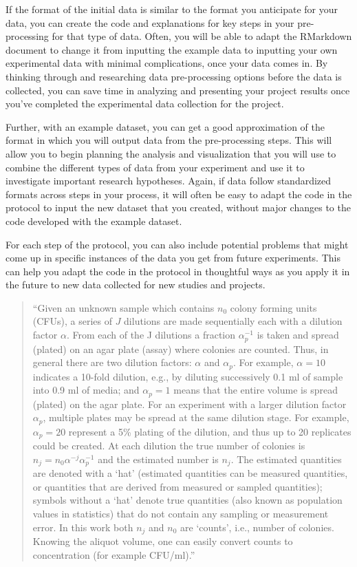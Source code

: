 \documentclass[]{tufte-book}
\begin{document}
If the format of the initial data is similar to the format you anticipate for
your data, you can create the code and explanations for key steps in your
pre-processing for that type of data. Often, you will be able to adapt the
RMarkdown document to change it from inputting the example data to inputting
your own experimental data with minimal complications, once your data
comes in. By thinking through and researching data pre-processing options
before the data is collected, you can save time in analyzing and presenting
your project results once you've completed the experimental data
collection for the project.

Further, with an example dataset, you can get a good approximation of the
format in which you will output data from the pre-processing steps.
This will allow you to begin planning the analysis and visualization
that you will use to combine the different types of data from your
experiment and use it to investigate important research hypotheses.
Again, if data follow standardized formats across steps in your process,
it will often be easy to adapt the code in the protocol to input the new
dataset that you created, without major changes to the code developed with
the example dataset.

For each step of the protocol, you can also include potential problems
that might come up in specific instances of the data you get from
future experiments. This can help you adapt the code in the protocol in
thoughtful ways as you apply it in the future to new data collected
for new studies and projects.

\begin{quote}
``Given an unknown sample which contains \(n_0\) colony forming units (CFUs), a
series of \(J\) dilutions are made sequentially each with a dilution factor
\(\alpha\). From each of the J dilutions a fraction \(\alpha_p^{-1}\) is taken and
spread (plated) on an agar plate (assay) where colonies are counted. Thus, in
general there are two dilution factors: \(\alpha\) and \(\alpha_p\). For example,
\(\alpha = 10\) indicates a 10-fold dilution, e.g., by diluting successively 0.1
ml of sample into 0.9 ml of media; and \(\alpha_p = 1\) means that the entire
volume is spread (plated) on the agar plate. For an experiment with a larger
dilution factor \(\alpha_p\), multiple plates may be spread at the same dilution
stage. For example, \(\alpha_p = 20\) represent a 5\% plating of the dilution, and
thus up to 20 replicates could be created. At each dilution the true number of
colonies is \(n_j = n_0 \alpha^{-j} \alpha_p^{-1}\) and the estimated number is
\(\hat{n_j}\). The estimated quantities are denoted with a `hat' (estimated
quantities can be measured quantities, or quantities that are derived from
measured or sampled quantities); symbols without a `hat' denote true quantities
(also known as population values in statistics) that do not contain any sampling
or measurement error. In this work both \(n_j\) and \(n_0\) are `counts', i.e.,
number of colonies. Knowing the aliquot volume, one can easily convert counts to
concentration (for example CFU/ml).'' \citep{ben2014estimation}
\end{quote}
\end{document}
